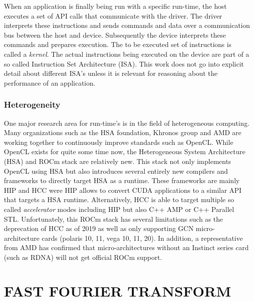\documentclass[conference]{IEEEtran}
\begin{document}
When an application is finally being run with a specific run-time, the
host executes a set of API calls that communicate with the driver. The
driver interprets these instructions and sends commands and data over a
communication bus between the host and device. Subsequently the device
interprets these commands and prepares execution\footnotemark[7]. The to be
executed set of instructions is called a \textit{kernel}. The actual
instructions being executed on the device are part of a so called Instruction
Set Architecture (ISA). This work does not go into explicit detail about
different ISA's unless it is relevant for reasoning about the performance of an
application.


\subsubsection*{Heterogeneity}

One major research area for run-time's is in the field of heterogeneous
computing. Many organizations such as the HSA foundation, Khronos group and
AMD are working together to continuously improve standards such as OpenCL.
While OpenCL exists for quite some time now, the Heterogeneous System
Architecture (HSA) and ROCm stack are relatively new. This stack not only
implements OpenCL using HSA but also introduces several entirely new compilers
and frameworks to directly target HSA as a runtime. These frameworks are mainly
HIP and HCC were HIP allows to convert CUDA applications to a similar API that
targets a HSA runtime. Alternatively, HCC is able to target multiple so called
\textit{accelerator} modes including HIP but also C++ AMP or C++ Parallel STL.
Unfortunately, this ROCm stack has several limitations such as the deprecation
of HCC as of 2019 as well as only supporting GCN micro-architecture cards
(polaris 10, 11, vega 10, 11, 20). In addition, a representative from AMD has
confirmed that micro-architectures without an Instinct series card
(such as RDNA) will not get official ROCm support\cite{rocm-no-rdna}.

\section{FAST FOURIER TRANSFORM}
\end{document}
